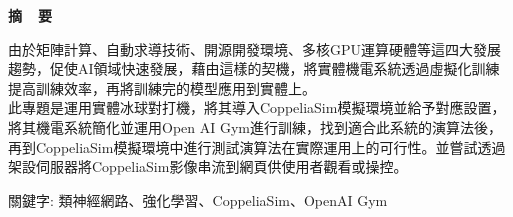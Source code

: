 \renewcommand{\baselinestretch}{1.5} %
\clearpage  %
\sectionef
{} %
\begin{center}
\LARGE\textbf{摘~~要}\\
\end{center}
\begin{flushleft}
\fontsize{14pt}{20pt}\sectionef\hspace{12pt}\quad 由於矩陣計算、自動求導技術、開源開發環境、多核GPU運算硬體等這四大發展趨勢，促使AI領域快速發展，藉由這樣的契機，將實體機電系統透過虛擬化訓練提高訓練效率，再將訓練完的模型應用到實體上。\\[12pt]

\fontsize{14pt}{20pt}\sectionef\hspace{12pt}\quad 此專題是運用實體冰球對打機，將其導入CoppeliaSim模擬環境並給予對應設置，將其機電系統簡化並運用Open AI Gym進行訓練，找到適合此系統的演算法後，再到CoppeliaSim模擬環境中進行測試演算法在實際運用上的可行性。並嘗試透過架設伺服器將CoppeliaSim影像串流到網頁供使用者觀看或操控。\\[12pt]

\end{flushleft}
\begin{center}
\fontsize{14pt}{20pt}\selectfont 關鍵字: 類神經網路、強化學習、\sectionef CoppeliaSim、OpenAI Gym
\end{center}
\newpage
\renewcommand{\baselinestretch}{1.5} %
